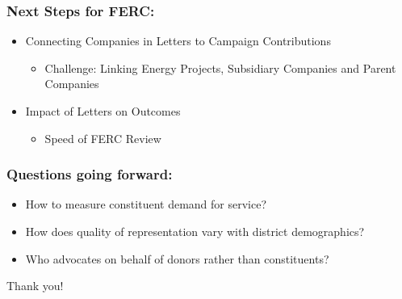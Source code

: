 \documentclass[13pt]{beamer}
\begin{document}
\begin{frame} 
\frametitle{Next Steps for FERC:}
\Large
\begin{itemize}
\item Connecting Companies in Letters to Campaign Contributions
\begin{itemize}
\item Challenge: Linking Energy Projects, Subsidiary Companies and Parent Companies
\end{itemize}
\bigskip
\item Impact of Letters on Outcomes
\begin{itemize}
\item Speed of FERC Review
\end{itemize}
\end{itemize}
\end{frame}





\begin{frame}
\frametitle{Questions going forward:}
\Large 
\begin{itemize}
\item How to measure constituent demand for service?
\item How does quality of representation vary with district demographics?
\item Who advocates on behalf of donors rather than constituents?
\end{itemize}
\bigskip
\end{frame}

\begin{frame}
\centering
\huge
Thank you! 
\end{frame}
\appendix
\begin{frame}
\maketitle
\end{frame}
\end{document}
